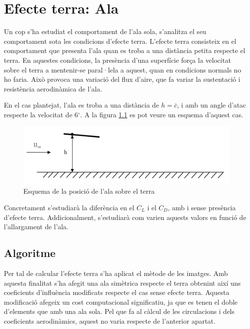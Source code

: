 \chapter{Efecte terra: Ala}
Un cop s'ha estudiat el comportament de l'ala sola, s'analitza el seu comportament sota les condicions d'efecte terra. L'efecte terra consisteix en el comportament que presenta l'ala quan es troba a una distància petita respecte el terra. En aquestes condicions, la presència d'una superfície força la velocitat sobre el terra a mentenir-se paral·lela a aquest, quan en condicions normals no ho faria. Això provoca una variació del flux d'aire, que fa variar la sustentació i resistència aerodinàmica de l'ala.

En el cas plantejat, l'ala es troba a una distància de $h=\bar{c}$, i amb un angle d'atac respecte la velocitat de 6$^{\circ}$. A la figura \ref{GroundEffect} es pot veure un esquema d'aquest cas.

\begin{figure}[H]
	\centering
	\includegraphics[scale=0.5]{./plots/GroundEffectWing.png}
	\caption[Esquema de la posició de l'ala sobre el terra]{Esquema de la posició de l'ala sobre el terra \cite{LizandraDalmases2017a}}
	\label{GroundEffect}
\end{figure}

Concretament s'estudiarà la diferència  en el $C_{L}$ i el $C_{D}$, amb i sense presència d'efecte terra. Addicionalment, s'estudiarà com varien aquests valors en funció de l'allargament de l'ala.

\section{Algoritme}
\label{gndAlg}
Per tal de calcular l'efecte terra s'ha aplicat el mètode de les imatges. Amb aquesta finalitat s'ha afegit una ala simètrica respecte el terra obtenint així uns coeficients d'influència modificats respecte el cas sense efecte terra. Aquesta modificació afegeix un cost computacional significatiu, ja que es tenen el doble d'elements que amb una ala sola. Pel que fa al càlcul de les circulacions i dels coeficients aerodinàmics, aquest no varia respecte de l'anterior apartat.


